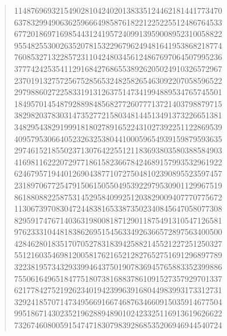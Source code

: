\documentclass[oneside,12pt]{book}   	%
\theoremstyle{definition}
\begin{document}
\begin{spacing}{1.618}
\begin{quote}
11487696932154902810424020138335124462181441773470 \\
63783299490636259666498587618221225225512486764533 \\
67720186971698544312419572409913959008952310058822 \\
95548255300263520781532296796249481641953868218774 \\
76085327132285723110424803456124867697064507995236 \\
37774242535411291684276865538926205024910326572967 \\
23701913275725675285653248258265463092207058596522 \\
29798860272258331913126375147341994889534765745501 \\
18495701454879288984856827726077713721403798879715 \\
38298203783031473527721580348144513491373226651381 \\
34829543829199918180278916522431027392251122869539 \\
40957953066405232632538044100059654939159879593635 \\
29746152185502371307642255121183693803580388584903 \\
41698116222072977186158236678424689157993532961922 \\
62467957194401269043877107275048102390895523597457 \\
23189706772547915061505504953922979530901129967519 \\
86188088225875314529584099251203829009407770775672 \\
11306739708304724483816533873502340845647058077308 \\
82959174767140363198008187129011875491310547126581 \\
97623331044818386269515456334926366572897563400500 \\
42846280183517070527831839425882145521227251250327 \\
55121603546981200581762165212827652751691296897789 \\
32238195734329339946437501907836945765883352399886 \\
75506164965184775180738168837861091527357929701337 \\
62177842752192623401942399639168044983993173312731 \\
32924185707147349566916674687634660915035914677504 \\
99518671430235219628894890102423325116913619626622 \\
73267460800591547471830798392868535206946944540724 \\

\end{quote}
\end{spacing}
\end{document}
